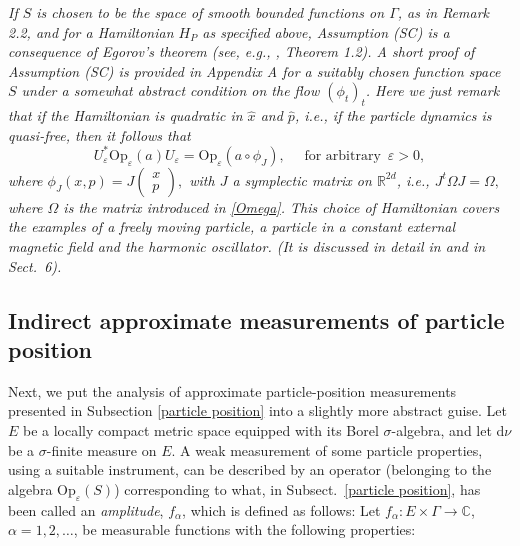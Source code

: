 \documentclass[11pt]{article}
\begin{document}
 \textit{If $S$ is chosen to be the space of smooth bounded functions on $\Gamma$, as in 
Remark 2.2, and for a Hamiltonian $H_P$ as specified above, Assumption (SC) is a consequence of Egorov's theorem
(see, e.g., \cite{BR}, Theorem 1.2). A short proof of Assumption (SC) is provided in Appendix A for a suitably chosen 
function space $S$ under a somewhat abstract condition on the flow $(\phi_t)_t$. Here we just remark that if the Hamiltonian is quadratic in $\hat{x}$ and $\hat{p}$, i.e., 
if the particle dynamics is quasi-free, then it follows that}
\begin{equation}\label{symp matrix}
U_{\varepsilon}^{*} \text{Op}_{\varepsilon}(a) U_{\varepsilon} = \text{Op}_{\varepsilon}(a\circ \phi_J), \quad \text{ for arbitrary }\,\varepsilon>0,
\end{equation}
\textit{where $\phi_{J}(x,p) = J\begin{pmatrix} x \\ p \end{pmatrix},$ with $J$ a symplectic matrix on $\mathbb{R}^{2d}$, i.e.,
$J^{t} \Omega J = \Omega,$ where $\Omega$ is the matrix introduced in \eqref{Omega}.
This choice of Hamiltonian covers the examples of a freely moving particle, a particle in a constant external 
magnetic field and the harmonic oscillator. (It is discussed in detail in \cite{BBFF} and in Sect.~6).}

\subsection{Indirect approximate measurements of particle position}\label{measurement}
Next, we put the analysis of approximate particle-position measurements presented in Subsection 
\ref{particle position} into a slightly more abstract guise. Let $E$ be a locally compact metric space equipped with its Borel $\sigma$-algebra, and let d$\nu$ be a 
$\sigma$-finite measure on $E$. A weak measurement of some particle properties, using a suitable 
instrument, can be described by an operator (belonging to the algebra $\text{Op}_{\varepsilon}(S)$) corresponding to what, in 
Subsect.~\ref{particle position}, has been called an \textit{amplitude}, $f_{\alpha}$, which is defined as follows: Let
$f_{\alpha}: E\times \Gamma \rightarrow \mathbb{C}$, $\alpha = 1,2, \dots$, be measurable functions with the following properties: 
\end{document}
